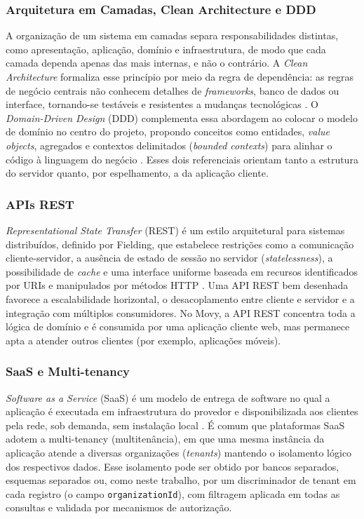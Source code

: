 \subsubsection{Arquitetura em Camadas, Clean Architecture e DDD}

A organização de um sistema em camadas separa responsabilidades
distintas, como apresentação, aplicação, domínio e infraestrutura, de modo
que cada camada dependa apenas das mais internas, e não o contrário. A
\textit{Clean Architecture} formaliza esse princípio por meio da
regra de dependência: as regras de negócio centrais não conhecem
detalhes de \textit{frameworks}, banco de dados ou interface, tornando-se
testáveis e resistentes a mudanças tecnológicas \cite{martin2017}. O
\textit{Domain-Driven Design} (DDD) complementa essa abordagem ao colocar o
modelo de domínio no centro do projeto, propondo conceitos como
entidades, \textit{value objects}, agregados e contextos delimitados
(\textit{bounded contexts}) para alinhar o código à linguagem do negócio
\cite{evans2003}. Esses dois referenciais orientam tanto a estrutura do
servidor quanto, por espelhamento, a da aplicação cliente.

\subsubsection{APIs REST}

\textit{Representational State Transfer} (REST) é um estilo arquitetural para
sistemas distribuídos, definido por Fielding, que estabelece restrições como
a comunicação cliente-servidor, a ausência de estado de sessão no
servidor (\textit{statelessness}), a possibilidade de \textit{cache} e uma
interface uniforme baseada em recursos identificados por URIs e manipulados
por métodos HTTP \cite{fielding2000}. Uma API REST bem desenhada favorece a
escalabilidade horizontal, o desacoplamento entre cliente e servidor e a
integração com múltiplos consumidores. No Movy, a API REST concentra toda a
lógica de domínio e é consumida por uma aplicação cliente web, mas permanece
apta a atender outros clientes (por exemplo, aplicações móveis).

\subsubsection{SaaS e Multi-tenancy}

\textit{Software as a Service} (SaaS) é um modelo de entrega de software no
qual a aplicação é executada em infraestrutura do provedor e disponibilizada
aos clientes pela rede, sob demanda, sem instalação local \cite{nist800145}. É
comum que plataformas SaaS adotem a multi-tenancy (multitenância), em
que uma mesma instância da aplicação atende a diversas organizações
(\textit{tenants}) mantendo o isolamento lógico dos respectivos
dados. Esse isolamento pode ser obtido por bancos separados, esquemas
separados ou, como neste trabalho, por um discriminador de tenant em
cada registro (o campo \texttt{organizationId}), com filtragem aplicada em
todas as consultas e validada por mecanismos de autorização.

